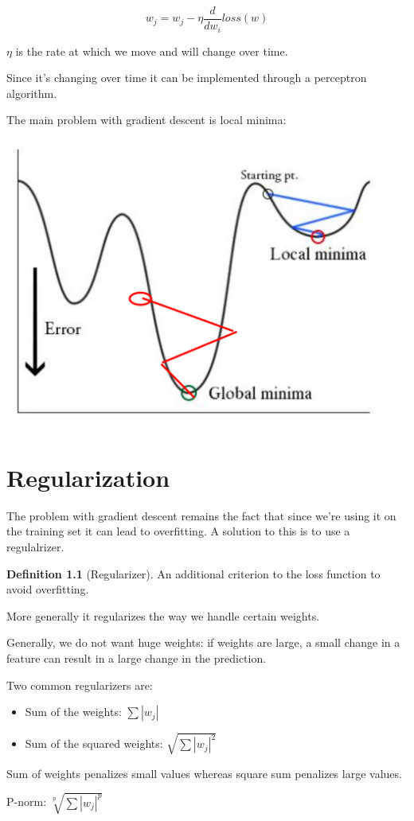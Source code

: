 \documentclass[oneside]{book}
\theoremstyle{definition}
\newtheorem{definition}{Definition}[section]
\begin{document}
\[
w_j = w_j - \eta \frac{d}{dw_i}loss(w)
\]



$\eta$ is the rate at which we move and will change over time.

Since it's changing over time it can be implemented through a perceptron algorithm.

The main problem with gradient descent is local minima: 

\includegraphics[scale=0.2]{local_minima}

\chapter{Regularization}
The problem with gradient descent remains the fact that since we're using it on the training set it can lead to overfitting. A solution to this is to use a regulalrizer.

\begin{definition}[Regularizer]
	An additional criterion to the loss function to avoid overfitting.
\end{definition}

More generally it regularizes the way we handle certain weights.

Generally, we do not want huge weights: if weights are large, a small change in a feature can result in a large change in the prediction.

Two common regularizers are: 

\begin{itemize}
	\item Sum of the weights: $\sum |w_j|$
	\item Sum of the squared weights: $\sqrt{\sum |w_j|^2}$
\end{itemize}

Sum of weights penalizes small values whereas square sum penalizes large values. 

P-norm: $\sqrt[p]{\sum |w_j|^p}$
\end{document}
